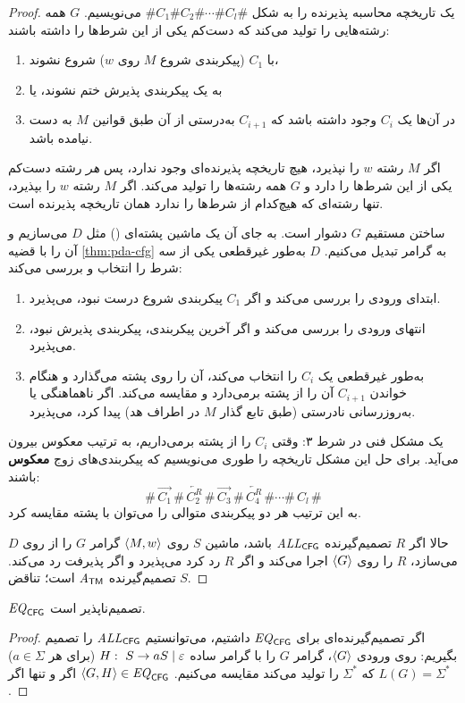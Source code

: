 \begin{proof}
یک تاریخچه محاسبه پذیرنده را به شکل $\#C_1\#C_2\#\cdots\#C_l\#$ می‌نویسیم. $G$ همه رشته‌هایی را تولید می‌کند که دست‌کم یکی از این شرط‌ها را داشته باشند:
\begin{enumerate}
\item با $C_1$ (پیکربندی شروع $M$ روی $w$) شروع نشوند،
\item به یک پیکربندی پذیرش ختم نشوند، یا
\item در آن‌ها یک $C_i$ وجود داشته باشد که $C_{i+1}$ به‌درستی از آن طبق قوانین $M$ به دست نیامده باشد.
\end{enumerate}
اگر $M$ رشته $w$ را نپذیرد، هیچ تاریخچه پذیرنده‌ای وجود ندارد، پس \emph{هر} رشته دست‌کم یکی از این شرط‌ها را دارد و $G$ همه رشته‌ها را تولید می‌کند. اگر $M$ رشته $w$ را بپذیرد، تنها رشته‌ای که هیچ‌کدام از شرط‌ها را ندارد همان تاریخچه پذیرنده است.

ساختن مستقیم $G$ دشوار است. به جای آن یک ماشین پشته‌ای () مثل $D$ می‌سازیم و آن را با قضیه \ref{thm:pda-cfg} به گرامر تبدیل می‌کنیم. $D$ به‌طور غیرقطعی یکی از سه شرط را انتخاب و بررسی می‌کند:
\begin{enumerate}
\item ابتدای ورودی را بررسی می‌کند و اگر $C_1$ پیکربندی شروع درست نبود، می‌پذیرد.
\item انتهای ورودی را بررسی می‌کند و اگر آخرین پیکربندی، پیکربندی پذیرش نبود، می‌پذیرد.
\item به‌طور غیرقطعی یک $C_i$ را انتخاب می‌کند، آن را روی پشته می‌گذارد و هنگام خواندن $C_{i+1}$ آن را از پشته برمی‌دارد و مقایسه می‌کند. اگر ناهماهنگی یا به‌روزرسانی نادرستی (طبق تابع گذار $M$ در اطراف هد) پیدا کرد، می‌پذیرد.
\end{enumerate}
یک مشکل فنی در شرط ۳: وقتی $C_i$ را از پشته برمی‌داریم، به ترتیب معکوس بیرون می‌آید. برای حل این مشکل تاریخچه را طوری می‌نویسیم که پیکربندی‌های زوج \textbf{معکوس} باشند:
\[\#\,\overrightarrow{C_1}\,\#\,\overleftarrow{C_2^R}\,\#\,\overrightarrow{C_3}\,\#\,\overleftarrow{C_4^R}\,\#\cdots\#\,C_l\,\#\]
به این ترتیب هر دو پیکربندی متوالی را می‌توان با پشته مقایسه کرد.

حالا اگر $R$ تصمیم‌گیرنده $\mathit{ALL}_{\mathsf{CFG}}$ باشد، ماشین $S$ روی $\langle M,w\rangle$ گرامر $G$ را از روی $D$ می‌سازد، $R$ را روی $\langle G\rangle$ اجرا می‌کند و اگر $R$ رد کرد می‌پذیرد و اگر پذیرفت رد می‌کند. $S$ تصمیم‌گیرنده $\mathit{A}_{\mathsf{TM}}$ است؛ تناقض.
\end{proof}

\begin{corollary}
$\mathit{EQ}_{\mathsf{CFG}}$ تصمیم‌ناپذیر است.
\end{corollary}
\begin{proof}
اگر تصمیم‌گیرنده‌ای برای $\mathit{EQ}_{\mathsf{CFG}}$ داشتیم، می‌توانستیم $\mathit{ALL}_{\mathsf{CFG}}$ را تصمیم بگیریم: روی ورودی $\langle G\rangle$، گرامر $G$ را با گرامر ساده $H:\ S\to aS\mid\varepsilon$ (برای هر $a\in\Sigma$) که $\Sigma^*$ را تولید می‌کند مقایسه می‌کنیم. $\langle G,H\rangle\in\mathit{EQ}_{\mathsf{CFG}}$ اگر و تنها اگر $L(G)=\Sigma^*$.
\end{proof}

